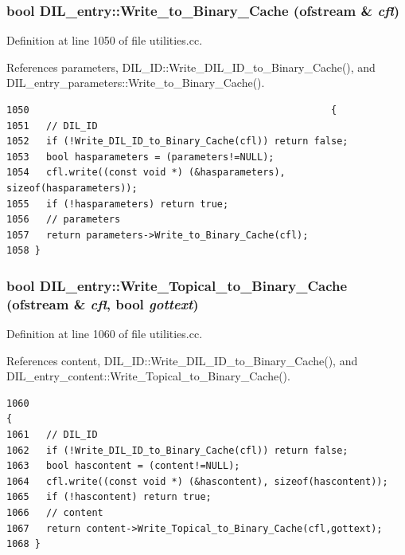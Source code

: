 \subsubsection{\setlength{\rightskip}{0pt plus 5cm}bool DIL\_\-entry::Write\_\-to\_\-Binary\_\-Cache (ofstream \& {\em cfl})}\label{classDIL__entry_a22}




Definition at line 1050 of file utilities.cc.

References parameters, DIL\_\-ID::Write\_\-DIL\_\-ID\_\-to\_\-Binary\_\-Cache(), and DIL\_\-entry\_\-parameters::Write\_\-to\_\-Binary\_\-Cache().



\footnotesize\begin{verbatim}1050                                                     {
1051   // DIL_ID
1052   if (!Write_DIL_ID_to_Binary_Cache(cfl)) return false;
1053   bool hasparameters = (parameters!=NULL);
1054   cfl.write((const void *) (&hasparameters), sizeof(hasparameters));
1055   if (!hasparameters) return true;
1056   // parameters
1057   return parameters->Write_to_Binary_Cache(cfl);
1058 }
\end{verbatim}\normalsize 
{}
\subsubsection{\setlength{\rightskip}{0pt plus 5cm}bool DIL\_\-entry::Write\_\-Topical\_\-to\_\-Binary\_\-Cache (ofstream \& {\em cfl}, bool {\em gottext})}\label{classDIL__entry_a23}




Definition at line 1060 of file utilities.cc.

References content, DIL\_\-ID::Write\_\-DIL\_\-ID\_\-to\_\-Binary\_\-Cache(), and DIL\_\-entry\_\-content::Write\_\-Topical\_\-to\_\-Binary\_\-Cache().



\footnotesize\begin{verbatim}1060                                                                           {
1061   // DIL_ID
1062   if (!Write_DIL_ID_to_Binary_Cache(cfl)) return false;
1063   bool hascontent = (content!=NULL);
1064   cfl.write((const void *) (&hascontent), sizeof(hascontent));
1065   if (!hascontent) return true;
1066   // content
1067   return content->Write_Topical_to_Binary_Cache(cfl,gottext);
1068 }
\end{verbatim}\normalsize 


